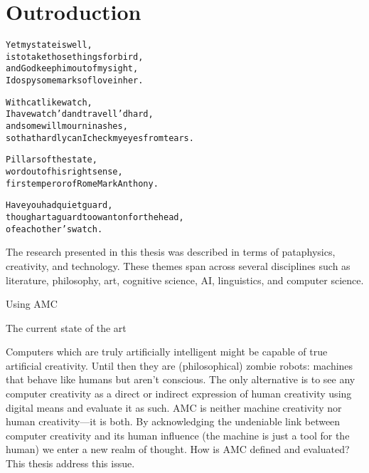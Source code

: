 
\chapter{Outroduction}
\label{ch:observations}

\startcontents[chapters]

\vfill

\begin{alltt}\sffamily
Yet my state is well,
is to take those things for bird,
and God keep him out of my sight,
I do spy some marks of love in her.

With catlike watch,
I have watch'd and travell'd hard,
and some will mourn in ashes,
so that hardly can I check my eyes from tears.

Pillars of the state,
word out of his right sense,
first emperor of Rome Mark Anthony.

Have you had quiet guard,
though art a guard too wanton for the head,
of each other's watch.
\end{alltt}

\newpage
\minicontents
\spirals





The research presented in this thesis was described in terms of pataphysics, creativity, and technology. These themes span across several disciplines such as literature, philosophy, art, cognitive science, \ac{AI}, linguistics, and computer science.

Using \acf{AMC} 

The current state of the art

Computers which are truly artificially intelligent might be capable of true artificial creativity. Until then they are (philosophical) zombie robots: machines that behave like humans but aren't conscious. The only alternative is to see any computer creativity as a direct or indirect expression of human creativity using digital means and evaluate it as such. \ac{AMC} is neither machine creativity nor human creativity---it is both. By acknowledging the undeniable link between computer creativity and its human influence (the machine is just a tool for the human) we enter a new realm of thought. How is \ac{AMC} defined and evaluated? This thesis address this issue. 

